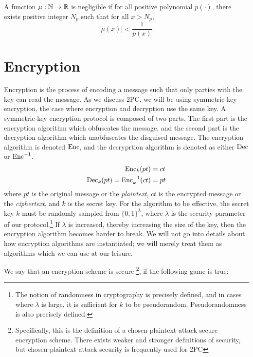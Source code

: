 \begin{definition}
\label{defn:negible}
A function $\mu : \mathbb{N} \to \mathbb{R}$ is negligible if for all positive polynomial $p(\cdot)$, there exists positive integer $N_p$ such that for all $x > N_p$, 
\begin{equation}
    |\mu(x)| < \frac{1}{p(x)}.
\end{equation}
\cite{goldreich}
\end{definition}

\section{Encryption}
Encryption is the process of encoding a message such that only parties with the key can read the message.
As we discuss 2PC, we will be using symmetric-key encryption, the case where encryption and decryption use the same key.
A symmetric-key encryption protocol is composed of two parts.
The first part is the encryption algorithm which obfuscates the message, and the second part is the decryption algorithm which unobfuscates the disguised message.
The encryption algorithm is denoted $\operatorname{Enc}$, and the decryprtion algorithm is denoted as either $\operatorname{Dec}$ or $\operatorname{Enc}^{-1}$.
\begin{equation}
    \label{eqn:encryption}
    \begin{split}
        \operatorname{Enc}_k (pt) & = ct  \\
        \operatorname{Dec}_k(pt) = \operatorname{Enc}^{-1}_k(ct) & = pt
    \end{split}
\end{equation}
where $pt$ is the original message or the \emph{plaintext}, $ct$ is the encrypted message or the \emph{ciphertext}, and $k$ is the secret key.
For the algorithm to be effective, the secret key $k$ must be randomly sampled from $\{0,1\}^\lambda$, where $\lambda$ is the security parameter of our protocol.\footnote{The notion of randomness in cryptography is precisely defined, and in cases where $\lambda$ is large, it is sufficient for $k$ to be pseudorandom. Pseudorandomness is also precisely defined.}
If  $\lambda$ is increased, thereby increasing the size of the key, then the encryption algorithm becomes harder to break.
We will not go into details about how encryption algorithms are instantiated; we will merely treat them as algorithms which we can use at our leisure.

We say that an encryption scheme is secure \footnote{Specifically, this is the definition of a chosen-plaintext-attack secure encryption scheme. There exists weaker and stronger definitions of security, but chosen-plaintext-attack security is frequently used for 2PC}, if the following game is true:

